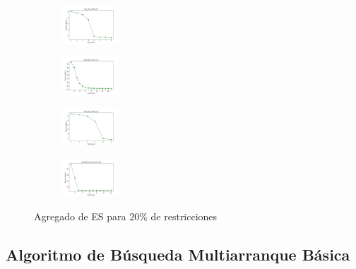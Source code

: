 \begin{figure}[H]
\begin{subfigure}
        \centering
        \includegraphics[width=0.234\textwidth]{img/es/iris_set_const_20_3773969821_cost.png}
    \end{subfigure}
    \hfill
    \begin{subfigure}
        \centering
        \includegraphics[width=0.234\textwidth]{img/es/ecoli_set_const_20_3773969821_cost.png}
    \end{subfigure}
    \hfill
    \begin{subfigure}
        \centering
        \includegraphics[width=0.234\textwidth]{img/es/rand_set_const_20_3773969821_cost.png}
    \end{subfigure}
    \hfill
    \begin{subfigure}
        \centering
        \includegraphics[width=0.234\textwidth]{img/es/newthyroid_set_const_20_3773969821_cost.png}
    \end{subfigure}
    \caption{Agregado de ES para 20\% de restricciones}
\end{figure}

\vspace*{\fill}
\newpage


\subsection{Algoritmo de Búsqueda Multiarranque Básica}

